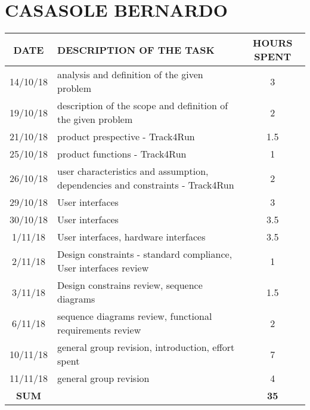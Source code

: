 \section{CASASOLE BERNARDO}
\begin{table}[h!]
	\begin{tabular}{|c|p{3in}|c|}
		\hline
		\textbf{DATE} &\textbf{DESCRIPTION OF THE TASK} & \textbf{HOURS SPENT}\\
		\hline
		14/10/18 & analysis and definition of the given problem & 3\\
		\hline
		19/10/18 & description of the scope and definition of the given problem & 2\\
		\hline
		21/10/18 & product prespective - Track4Run & 1.5\\
		\hline
		25/10/18 & product functions - Track4Run & 1\\
		\hline
		26/10/18 & user characteristics and assumption, dependencies and constraints - Track4Run & 2\\
		\hline
		29/10/18 & User interfaces & 3\\
		\hline
		30/10/18 & User interfaces & 3.5\\
		\hline
		1/11/18 & User interfaces, hardware interfaces & 3.5\\
		\hline
		2/11/18 & Design constraints - standard compliance, User interfaces review & 1\\
		\hline
		3/11/18 & Design constrains review, sequence diagrams & 1.5\\
		\hline
		6/11/18 & sequence diagrams review, functional requirements review & 2\\
		\hline
		10/11/18 & general group revision, introduction, effort spent & 7\\
		\hline
		11/11/18 & general group revision & 4\\
		\hline
		\textbf{SUM} &  & 	\textbf{35}\\
		\hline
	\end{tabular}
\end{table}